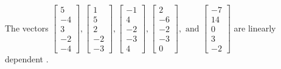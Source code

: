 \begin{exercise}
\begin{exerciseStatement}
  \end{exerciseStatement}
  \begin{exerciseAnswer}
   The vectors \(\left[\begin{array}{r}
5 \\
-4 \\
3 \\
-2 \\
-4
\end{array}\right] , \left[\begin{array}{r}
1 \\
5 \\
2 \\
-2 \\
-3
\end{array}\right] , \left[\begin{array}{r}
-1 \\
4 \\
-2 \\
-3 \\
4
\end{array}\right] , \left[\begin{array}{r}
2 \\
-6 \\
-2 \\
-3 \\
0
\end{array}\right] , \text{ and } \left[\begin{array}{r}
-7 \\
14 \\
0 \\
3 \\
-2
\end{array}\right]\) are 
  	 linearly dependent  .
  


  \end{exerciseAnswer}
\end{exercise}
